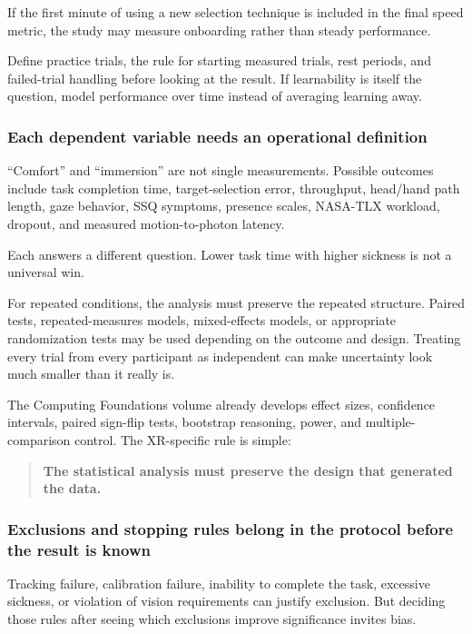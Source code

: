If the first minute of using a new selection technique is included in the final speed metric, the study may measure onboarding rather than steady performance.

Define practice trials, the rule for starting measured trials, rest periods, and failed-trial handling before looking at the result. If learnability is itself the question, model performance over time instead of averaging learning away.

\subsubsection{Each dependent variable needs an operational definition}\label{each-dependent-variable-needs-an-operational-definition}

``Comfort'' and ``immersion'' are not single measurements. Possible outcomes include task completion time, target-selection error, throughput, head/hand path length, gaze behavior, SSQ symptoms, presence scales, NASA-TLX workload, dropout, and measured motion-to-photon latency.

Each answers a different question. Lower task time with higher sickness is not a universal win.

For repeated conditions, the analysis must preserve the repeated structure. Paired tests, repeated-measures models, mixed-effects models, or appropriate randomization tests may be used depending on the outcome and design. Treating every trial from every participant as independent can make uncertainty look much smaller than it really is.

The Computing Foundations volume already develops effect sizes, confidence intervals, paired sign-flip tests, bootstrap reasoning, power, and multiple-comparison control. The XR-specific rule is simple:

\begin{quote}
\textbf{The statistical analysis must preserve the design that generated the data.}
\end{quote}

\subsubsection{Exclusions and stopping rules belong in the protocol before the result is known}\label{exclusions-and-stopping-rules-belong-in-the-protocol-before-the-result-is-known}

Tracking failure, calibration failure, inability to complete the task, excessive sickness, or violation of vision requirements can justify exclusion. But deciding those rules after seeing which exclusions improve significance invites bias.

